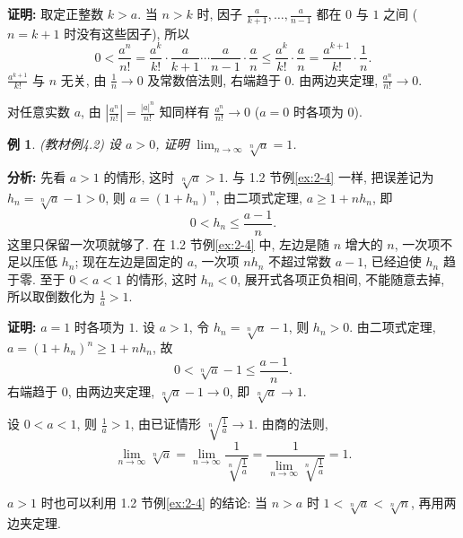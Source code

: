 \documentclass[UTF8,openany]{ctexbook}
\theoremstyle{chinesetextbook}
\newtheorem{example}{例}[section]
\newenvironment{cnproof}{\par\indent\textbf{证明:} \ignorespaces}{\par}
\begin{document}
\begin{cnproof}
取定正整数 $k>a$. 当 $n>k$ 时, 因子 $\displaystyle\frac a{k+1},\ldots,\frac a{n-1}$ 都在 $0$ 与 $1$ 之间 ($n=k+1$ 时没有这些因子), 所以
\[
0<\frac{a^n}{n!}=\frac{a^k}{k!}\cdot\frac a{k+1}\cdots\frac a{n-1}\cdot\frac an\le\frac{a^k}{k!}\cdot\frac an=\frac{a^{k+1}}{k!}\cdot\frac1n.
\]
$\displaystyle\frac{a^{k+1}}{k!}$ 与 $n$ 无关, 由 $\displaystyle\frac1n\to0$ 及常数倍法则, 右端趋于 $0$. 由两边夹定理, $\displaystyle\frac{a^n}{n!}\to0$.
\end{cnproof}
对任意实数 $a$, 由 $\displaystyle\left|\frac{a^n}{n!}\right|=\frac{|a|^n}{n!}$ 知同样有 $\displaystyle\frac{a^n}{n!}\to0$ ($a=0$ 时各项为 $0$).
\begin{example}
\textnormal{(教材例4.2)} 设 $a>0$, 证明 $\displaystyle\lim_{n\to\infty}\sqrt[n]a=1$.
\end{example}
\par\indent\textbf{分析:} 先看 $a>1$ 的情形, 这时 $\sqrt[n]a>1$. 与 1.2 节例\ref{ex:2-4} 一样, 把误差记为 $h_n=\sqrt[n]a-1>0$, 则 $a=(1+h_n)^n$, 由二项式定理, $a\ge1+nh_n$, 即
\[
0<h_n\le\frac{a-1}n.
\]
这里只保留一次项就够了. 在 1.2 节例\ref{ex:2-4} 中, 左边是随 $n$ 增大的 $n$, 一次项不足以压低 $h_n$; 现在左边是固定的 $a$, 一次项 $nh_n$ 不超过常数 $a-1$, 已经迫使 $h_n$ 趋于零. 至于 $0<a<1$ 的情形, 这时 $h_n<0$, 展开式各项正负相间, 不能随意去掉, 所以取倒数化为 $\displaystyle\frac1a>1$.
\begin{cnproof}
$a=1$ 时各项为 $1$. 设 $a>1$, 令 $h_n=\sqrt[n]a-1$, 则 $h_n>0$. 由二项式定理, $a=(1+h_n)^n\ge1+nh_n$, 故
\[
0<\sqrt[n]a-1\le\frac{a-1}n.
\]
右端趋于 $0$, 由两边夹定理, $\sqrt[n]a-1\to0$, 即 $\sqrt[n]a\to1$.

设 $0<a<1$, 则 $\displaystyle\frac1a>1$, 由已证情形 $\displaystyle\sqrt[n]{\frac1a}\to1$. 由商的法则,
\[
\lim_{n\to\infty}\sqrt[n]a=\lim_{n\to\infty}\frac1{\sqrt[n]{\frac1a}}=\frac1{\displaystyle\lim_{n\to\infty}\sqrt[n]{\frac1a}}=1.
\]
\end{cnproof}
$a>1$ 时也可以利用 1.2 节例\ref{ex:2-4} 的结论: 当 $n>a$ 时 $1<\sqrt[n]a<\sqrt[n]n$, 再用两边夹定理.
\end{document}

